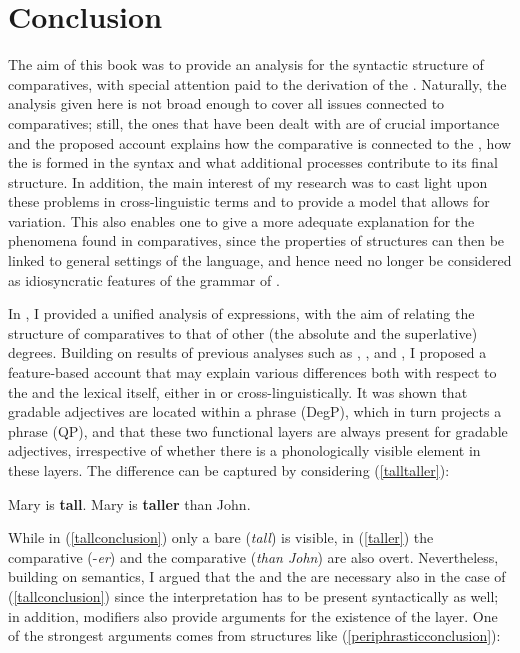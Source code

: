 \chapter{Conclusion} \label{ch:7}
The aim of this book was to provide an analysis for the syntactic structure of comparatives, with special attention paid to the derivation of the . Naturally, the analysis given here is not broad enough to cover all issues connected to comparatives; still, the ones that have been dealt with are of crucial importance and the proposed account explains how the comparative  is connected to the , how the  is formed in the syntax and what additional processes contribute to its final structure. In addition, the main interest of my research was to cast light upon these problems in cross-linguistic terms and to provide a model that allows for variation. This also enables one to give a more adequate explanation for the phenomena found in  comparatives, since the properties of  structures can then be linked to general settings of the language, and hence need no longer be considered as idiosyncratic features of the grammar of .

In , I provided a unified analysis of  expressions, with the aim of relating the structure of comparatives to that of other (the absolute and the superlative) degrees. Building on results of previous analyses such as \citet{bresnan1973}, \citet{izvorski1995}, \citet{corver1997} and \citet{lechner1999diss, lechner2004}, I proposed a feature-based account that may explain various differences both with respect to the  and the lexical  itself, either in  or cross-linguistically. It was shown that gradable adjectives are located within a  phrase (DegP), which in turn projects a  phrase (QP), and that these two functional layers are always present for gradable adjectives, irrespective of whether there is a phonologically visible element in these layers. The difference can be captured by considering (\ref{talltaller}):

\ea \label{talltaller}
\ea	Mary is \textbf{tall}. \label{tallconclusion}
\ex	Mary is \textbf{taller} than John. \label{taller}
\z
\z

While in (\ref{tallconclusion}) only a bare  (\textit{tall}) is visible, in (\ref{taller}) the comparative  (-\textit{er}) and the comparative  (\textit{than John}) are also overt. Nevertheless, building on  semantics, I argued that the  and the  are necessary also in the case of (\ref{tallconclusion}) since the  interpretation has to be present syntactically as well; in addition, modifiers also provide arguments for the existence of the  layer. One of the strongest arguments comes from structures like (\ref{periphrasticconclusion}):

